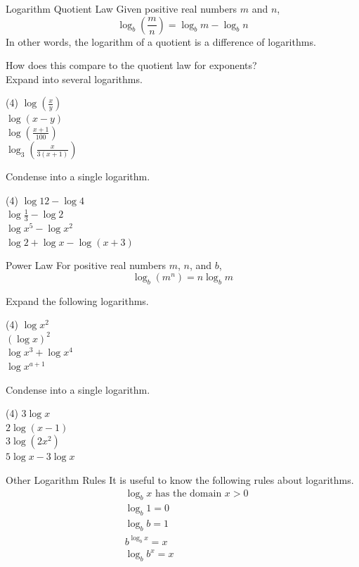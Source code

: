 \documentclass[12pt,fleqn]{book}
\begin{document}
\clearpage
\begin{thm}{Logarithm Quotient Law}{}
    Given positive real numbers $m$ and $n$,
    \[
        \log _b\left(\frac{m}{n}\right)=\log _b m-\log _b n
    \]
    In other words, the logarithm of a quotient is a difference of logarithms.
\end{thm}
How does this compare to the quotient law for exponents?
\\[1in]
Expand into several logarithms.
\begin{tasks}(4)
    \task $\log \left(\frac{x}{y}\right)$
    \\[2in]
    \task $\log (x-y)$
    \\[1in]
    \task $\log \left(\frac{x+1}{100}\right)$
    \\[2in]
    \task $\log _3\left(\frac{x}{3(x+1)}\right)$
    \\[1in]
\end{tasks}
Condense into a single logarithm.
\begin{tasks}(4)
    \task $\log 12-\log 4$
    \\[2in]
    \task $\log \frac{1}{3}-\log 2$
    \\[1in]
    \task $\log x^5-\log x^2$
    \\[2in]
    \task $\log 2+\log x-\log (x+3)$
    \\[1in]
\end{tasks}
\clearpage
\begin{thm}{Power Law}{}
    For positive real numbers $m$, $n$, and $b$,
    \[
        \log _b\left(m^n\right)=n \log _b m
    \]
\end{thm}
Expand the following logarithms.
\begin{tasks}(4)
    \task $\log x^2$
    \\[1in]
    \task $(\log x)^2$
    \\[1in]
    \task $\log x^3+\log x^4$
    \\[1in]
    \task $\log x^{a+1}$
    \\[1in]
\end{tasks}
Condense into a single logarithm.
\begin{tasks}(4)
    \task $3 \log x$
    \\[1in]
    \task $2 \log (x-1)$
    \\[1in]
    \task $3 \log \left(2 x^2\right)$
    \\[1in]
    \task $5 \log x-3 \log x$
    \\[1in]
\end{tasks}
\begin{thm}{Other Logarithm Rules}{}
    It is useful to know the following rules about logarithms.
    \begin{align*}
         & \log _b x \text { has the domain } x>0 \\
         & \log _b 1=0                            \\
         & \log _b b=1                            \\
         & b^{\log _b x}=x                        \\
         & \log _b b^x=x
    \end{align*}
\end{thm}
\end{document}
